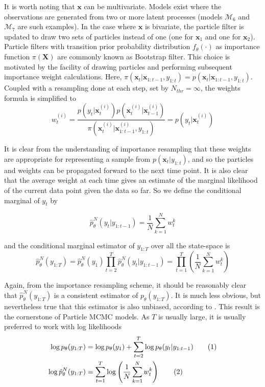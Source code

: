 \documentclass[11pt,a4,twosided,singlespacing,titlepagenumber=on]{scrreprt}
\numberwithin{equation}{chapter} %
\theoremstyle{remark}
\newcommand{\matr}[1]{\mathbf{#1}}
\newcommand\numberthis{\addtocounter{equation}{1}\tag{\theequation}}
\begin{document}
It is worth noting that $\matr{x}$ can be multivariate. Models exist where the observations are generated from two or more latent processes (models $\mathcal{M}_6$ and $\mathcal{M}_7$ are such examples). In the case where $\matr{x}$ is bivariate, the particle filter is updated to draw two sets of particles instead of one (one for $\matr{x}_1$ and one for $\matr{x}_2$). \\

Particle filters with transition prior probability distribution $f_\theta(\cdot)$ as importance function $\pi(\matr{X})$ are commonly known as Bootstrap filter. This choice is motivated by the facility of drawing particles and performing subsequent importance weight calculations. Here, $\pi(\matr{x}_t| \matr{x}_{1:t-1}, y_{1:t}) = p(\matr{x}_t |\matr{x}_{1:t-1}, y_{1:t})$. Coupled with a resampling done at each step, set by $N_{thr} = \infty$, the weights formula is simplified to
\begin{equation}
w_t^{(i)} = \frac{p(y_t|\matr{x}_t^{(i)})p(\matr{x}_t^{(i)}|\matr{x}^{(i)}_{t-1})}{\pi(\matr{x}_t^{(i)}|\matr{x}^{(i)}_{1:t-1},y_{1:t})}=  p(y_t|\matr{x}_t^{(i)})
\end{equation}

It is clear from the understanding of importance resampling that these weights are appropriate for representing a sample from $p(\matr{x}_t|y_{1:t})$, and so the particles and weights can be propagated forward to the next time point. It is also clear that the average weight at each time gives an estimate of the marginal likelihood of the current data point given the data so far. So we define the conditional marginal of $y_t$ by

\begin{equation}
 \hat{p}^N_{\theta}(y_t | y_{1:t-1}) = \frac{1}{N} \sum_{k=1}^N w_t^k
\end{equation}

and the conditional marginal estimator of $y_{1:T}$ over all the state-space is
\begin{equation}
 \hat{p}^N_\theta(y_{1:T}) = \hat{p}^N_\theta(y_1)\prod_{t=2}^T \hat{p}^N_\theta(y_t | y_{1:t-1}) = \prod_{t=1}^T \left( \frac{1}{N} \sum_{k=1}^N w_t^k \right)
\end{equation}

Again, from the importance resampling scheme, it should be reasonably clear that $\hat{p}^N_{\theta}(y_{1:T})$ is a consistent estimator of $p_{\theta}(y_{1:T})$. It is much less obvious, but nevertheless true that this estimator is also unbiased, according to \cite{delmoral2004}. This result is the cornerstone of Particle MCMC models. As $T$ is usually large, it is usually preferred to work with log likelihoods
\begin{align*}
\log p_{\theta}(y_{1:T}) &= \log p_\theta(y_1) + \sum_{t=2}^T \log p_\theta(y_t | y_{1:t-1}) \numberthis \\
\log \hat{p}^N_\theta(y_{1:T}) &= \sum_{t=1}^T \log \left(\frac{1}{N} \sum_{k=1}^N w_t^{k} \right) \numberthis
\end{align*}
\end{document}

